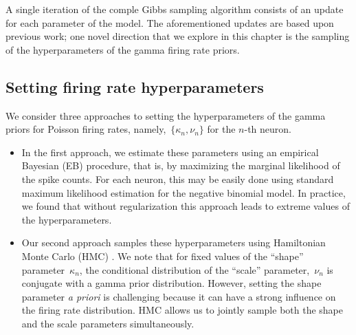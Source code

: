 A single iteration of the comple Gibbs sampling algorithm consists
of an update for each parameter of the model. The aforementioned
updates are based upon previous work; one novel direction that we
explore in this chapter is the sampling of the hyperparameters of the
gamma firing rate priors.

\subsection{Setting firing rate hyperparameters} 
\label{sec:fr_hypers}
We consider three approaches to setting the hyperparameters of the
gamma priors for Poisson firing rates, namely,~${\{\kappa_n,
  \nu_n\}}$ for the $n$-th neuron.  

\begin{itemize}

\item In the first approach, we estimate these parameters using an
  empirical Bayesian (EB) procedure, that is, by maximizing the
  marginal likelihood of the spike counts.  For each neuron, this may be
  easily done using standard maximum likelihood estimation for the
  negative binomial model.  In practice, we found that without
  regularization this approach leads to extreme values of the
  hyperparameters.

 

\item Our second approach samples these hyperparameters using
  Hamiltonian Monte Carlo (HMC) \citep{Neal10}. We note that for fixed
  values of the ``shape'' parameter~$\kappa_n$, the conditional
  distribution of the ``scale'' parameter,~$\nu_n$ is conjugate
  with a gamma prior distribution. However, setting the shape
  parameter \textit{a priori} is challenging because it can have a
  strong influence on the firing rate distribution. HMC allows us to
  jointly sample both the shape and the scale parameters
  simultaneously.


\end{itemize}
